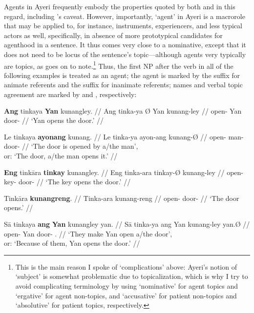 Agents in Ayeri frequently embody the properties quoted by both
\citeauthor{fillmore1968} and \citeauthor{payne1997} in this regard, including 
\citeauthor{fillmore1968}'s caveat. However, importantly, `agent' in Ayeri is 
a macrorole that may be applied to, for instance, instruments, experiencers,
and less typical actors as well, specifically, in absence of more prototypical
candidates for agenthood in a sentence. It thus comes very close to a
nominative, except that it does not need to be locus of the sentence's
topic---although agents very typically are topics, as
\citet[151]{payne1997} goes on to note.\footnote{This is the main reason I 
spoke of `complications' above: Ayeri's notion of `subject' is somewhat
problematic due to topicalization, which is why I try to avoid complicating
terminology by using `nominative' for agent topics and `ergative' for agent
non-topics, and `accusative' for patient non-topics and `absolutive' for
patient topics, respectively.} Thus, the first NP after the verb in all of the
following examples is treated as an agent; the agent is marked by the suffix
 for animate referents and the suffix  for 
inanimate referents; names and verbal topic agreement are marked by
 and , respectively:

\pex
\a\begingl
	\gla \textbf{Ang} tinkaya {} \textbf{Yan} kunangley. //
	\glb Ang tinka-ya Ø Yan kunang-ley //
	\glc \AgtT{} open-\TsgM{} \Top{} Yan door-\PargI{} //
	\glft `Yan opens the door.' //
\endgl

\a\begingl
	\gla Le tinkaya \textbf{ayonang} kunang. //
	\glb Le tinka-ya ayon-ang kunang-Ø //
	\glc \PatT{} open-\TsgM{} man-\Aarg{} door-\Top{} //
	\glft `The door is opened by a/the man',\\
		or: `The door, a/the man opens it.' //
\endgl

\a\begingl
	\gla \textbf{Eng} tinkāra \textbf{tinkay} kunangley. //
	\glb Eng tinka-ara tinkay-Ø kunang-ley //
	\glc \AgtTI{} open-\TsgI{} key-\Top{} door-\PargI{} //
	\glft `The key opens the door.' //
\endgl

\a\begingl
	\gla Tinkāra \textbf{kunangreng}. //
	\glb Tinka-ara kunang-reng //
	\glc open-\TsgI{} door-\AargI{} //
	\glft `The door opens.' //
\endgl

\a\begingl
	\gla Sā tinkaya \textbf{ang} \textbf{Yan} kunangley yan. //
	\glb Sā tinka-ya ang Yan kunang-ley yan.Ø //
	\glc \CauT{} open-\TsgM{} \Aarg{} Yan door-\PargI{} \TsgM{}.\Top{} //
	\glft `They make Yan open a/the door',\\
		or: `Because of them, Yan opens the door.' //
\endgl

